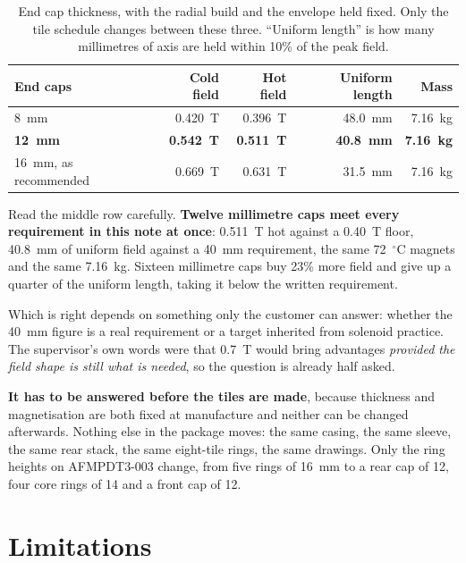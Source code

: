 \documentclass[11pt,a4paper]{article}
\newcommand{\degC}{$^\circ$C}
\begin{document}
\begin{table}[H]
\centering
\caption{End cap thickness, with the radial build and the envelope held fixed.
Only the tile schedule changes between these three. ``Uniform length'' is how
many millimetres of axis are held within 10\% of the peak field.}
\label{tab:caps}
\begin{tabular}{lrrrr}
\toprule
\textbf{End caps} & \textbf{Cold field} & \textbf{Hot field} &
\textbf{Uniform length} & \textbf{Mass} \\
\midrule
8~mm  & 0.420~T & 0.396~T & 48.0~mm & 7.16~kg \\
\textbf{12~mm} & \textbf{0.542~T} & \textbf{0.511~T} & \textbf{40.8~mm} & \textbf{7.16~kg} \\
16~mm, as recommended & 0.669~T & 0.631~T & 31.5~mm & 7.16~kg \\
\bottomrule
\end{tabular}
\end{table}

Read the middle row carefully. \textbf{Twelve millimetre caps meet every
requirement in this note at once}: 0.511~T hot against a 0.40~T floor, 40.8~mm
of uniform field against a 40~mm requirement, the same 72~\degC{} magnets and
the same 7.16~kg. Sixteen millimetre caps buy 23\% more field and give up a
quarter of the uniform length, taking it below the written requirement.

Which is right depends on something only the customer can answer: whether the
40~mm figure is a real requirement or a target inherited from solenoid
practice. The supervisor's own words were that 0.7~T would bring advantages
\emph{provided the field shape is still what is needed}, so the question is
already half asked.

\textbf{It has to be answered before the tiles are made}, because thickness and
magnetisation are both fixed at manufacture and neither can be changed
afterwards. Nothing else in the package moves: the same casing, the same
sleeve, the same rear stack, the same eight-tile rings, the same drawings. Only
the ring heights on AFMPDT3-003 change, from five rings of 16~mm to a rear cap
of 12, four core rings of 14 and a front cap of 12.

\section{Limitations}
\label{sec:limits}
\end{document}
